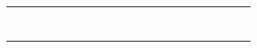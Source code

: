 ﻿\documentclass[12pt]{article}
\begin{document}
\begin{tabular}{|l|p{3.5cm}|p{3.5cm}|p{3.5cm}|p{1.5cm}|p{1.5cm}|l|l|l|l|l|l|l|l|l|l|l|l|l|}
& & & & & & & & & & & & & & & & & &  \\ \hline
& & & & & & & & & & & & & & & & & &  \\ \hline
& & & & & & & & & & & & & & & & & &  \\ \hline
& & & & & & & & & & & & & & & & & &  \\ \hline
& & & & & & & & & & & & & & & & & &  \\ \hline
& & & & & & & & & & & & & & & & & &  \\ \hline
& & & & & & & & & & & & & & & & & &  \\ \hline
& & & & & & & & & & & & & & & & & &  \\ \hline
\end{tabular}

\pagebreak

\end{document}
